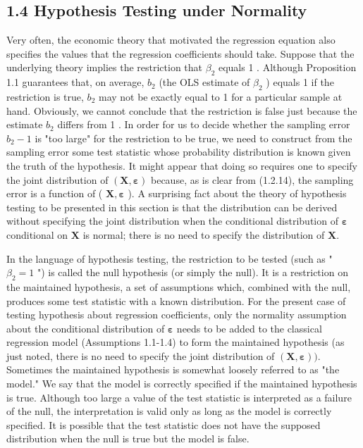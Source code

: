 \documentclass[10pt]{article}
\begin{document}
\subsection*{1.4 Hypothesis Testing under Normality}
Very often, the economic theory that motivated the regression equation also specifies the values that the regression coefficients should take. Suppose that the underlying theory implies the restriction that $\beta_{2}$ equals 1 . Although Proposition 1.1 guarantees that, on average, $b_{2}$ (the OLS estimate of $\beta_{2}$ ) equals 1 if the restriction is true, $b_{2}$ may not be exactly equal to 1 for a particular sample at hand. Obviously, we cannot conclude that the restriction is false just because the estimate $b_{2}$ differs from 1 . In order for us to decide whether the sampling error $b_{2}-1$ is "too large" for the restriction to be true, we need to construct from the sampling error some test statistic whose probability distribution is known given the truth of the hypothesis. It might appear that doing so requires one to specify the joint distribution of $(\mathbf{X}, \boldsymbol{\varepsilon})$ because, as is clear from (1.2.14), the sampling error is a function of ( $\mathbf{X}, \boldsymbol{\varepsilon}$ ). A surprising fact about the theory of hypothesis testing to be presented in this section is that the distribution can be derived without specifying the joint distribution when the conditional distribution of $\boldsymbol{\varepsilon}$ conditional on $\mathbf{X}$ is normal; there is no need to specify the distribution of $\mathbf{X}$.

In the language of hypothesis testing, the restriction to be tested (such as " $\beta_{2}=1$ ") is called the null hypothesis (or simply the null). It is a restriction on the maintained hypothesis, a set of assumptions which, combined with the null, produces some test statistic with a known distribution. For the present case of testing hypothesis about regression coefficients, only the normality assumption about the conditional distribution of $\boldsymbol{\varepsilon}$ needs to be added to the classical regression model (Assumptions 1.1-1.4) to form the maintained hypothesis (as just noted, there is no need to specify the joint distribution of $(\mathbf{X}, \boldsymbol{\varepsilon}))$. Sometimes the maintained hypothesis is somewhat loosely referred to as "the model." We say that the model is correctly specified if the maintained hypothesis is true. Although too large a value of the test statistic is interpreted as a failure of the null, the interpretation is valid only as long as the model is correctly specified. It is possible that the test statistic does not have the supposed distribution when the null is true but the model is false.
\end{document}
